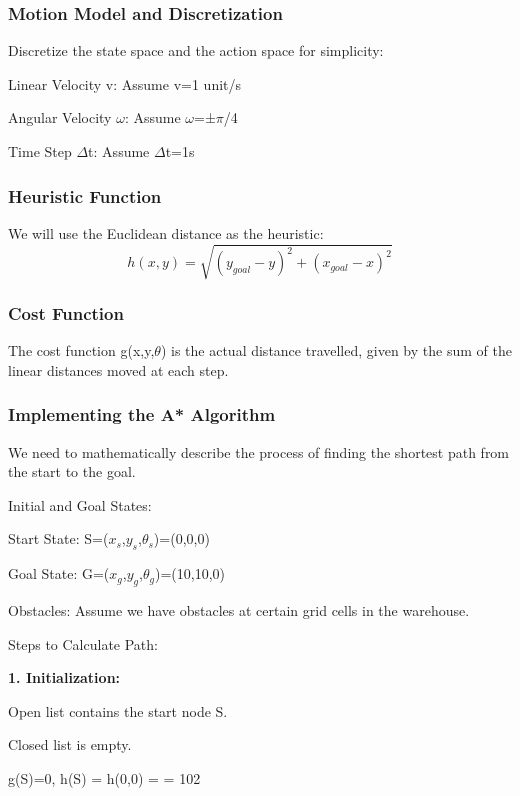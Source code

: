 \documentclass[9pt,a4paper,twoside]{rho-class/rho}
\begin{document}
     \subsubsection{Motion Model and Discretization}
     Discretize the state space and the action space for simplicity:

    Linear Velocity v: Assume v=1 unit/s 
    
    Angular Velocity $\omega$: Assume $\omega$=±$\pi$/4
    
    Time Step $\Delta$t: Assume $\Delta$t=1s

    \subsubsection{Heuristic Function}
    We will use the Euclidean distance as the heuristic:
    \begin{equation}
        h(x,y) = \sqrt{(y_{goal}-y)^2+(x_{goal}-x)^2}
    \end{equation}

    \subsubsection{Cost Function}
    The cost function g(x,y,$\theta$) is the actual distance travelled, given by the sum of the linear distances moved at each step.

    \subsubsection{Implementing the A* Algorithm}

    We need to mathematically describe the process of finding the shortest path from the start to the goal.
    
    Initial and Goal States:
    
    Start State: S=($x_s$,$y_s$,$\theta_s$)=(0,0,0)
    
    Goal State: G=($x_g$,$y_g$,$\theta_g$)=(10,10,0)
    
    Obstacles:
    Assume we have obstacles at certain grid cells in the warehouse.
    
    Steps to Calculate Path:
    
    \textbf{1. Initialization:}
    
        Open list contains the start node S.
        
        Closed list is empty.
        
        g(S)=0, h(S) = h(0,0) = = 102
        
\end{document}
